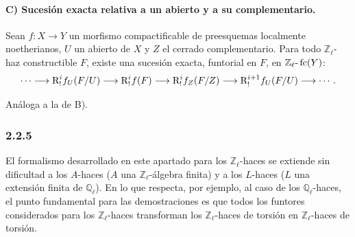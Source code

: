\paragraph{C) Sucesión exacta relativa a un abierto y a su complementario.}
Sean \(f:X\to Y\) un morfismo compactificable de preesquemas localmente noetherianos, \(U\) un abierto de \(X\) y \(Z\) el cerrado complementario. Para todo \(\mathbb Z_\ell\)-haz constructible \(F\), existe una sucesión exacta, funtorial en \(F\), en \(\mathbb Z_\ell\text{-}\operatorname{fc}(Y)\):
\[
\cdots\longrightarrow \mathrm{R}^i_!f_U(F/U)
\longrightarrow \mathrm{R}^i_!f(F)
\longrightarrow \mathrm{R}^i_!f_Z(F/Z)
\longrightarrow \mathrm{R}^{i+1}_!f_U(F/U)
\longrightarrow\cdots .
\]

\begin{prooftext}[Demostración]
Análoga a la de B).
\end{prooftext}

\subsubsection*{2.2.5}
El formalismo desarrollado en este apartado para los \(\mathbb Z_\ell\)-haces se extiende sin dificultad a los \(A\)-haces (\(A\) una \(\mathbb Z_\ell\)-álgebra finita) y a los \(L\)-haces (\(L\) una extensión finita de \(\mathbb Q_\ell\)). En lo que respecta, por ejemplo, al caso de los \(\mathbb Q_\ell\)-haces, el punto fundamental para las demostraciones es que todos los funtores considerados para los \(\mathbb Z_\ell\)-haces transforman los \(\mathbb Z_\ell\)-haces de torsión en \(\mathbb Z_\ell\)-haces de torsión.
